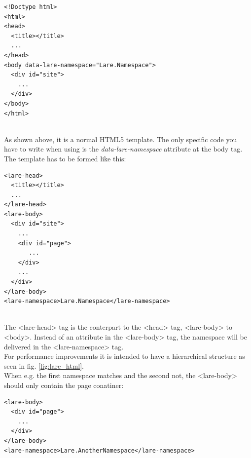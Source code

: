 \begin{minipage}[c]{0.95\linewidth}
\begin{lstlisting}[caption=Example Lare Base Template, label=example_lare_base_template]
<!Doctype html>
<html>
<head>
  <title></title>
  ...
</head>
<body data-lare-namespace="Lare.Namespace">
  <div id="site">
    ...
  </div>
</body>
</html>
\end{lstlisting}
\end{minipage}
\\
As shown above, it is a normal HTML5 template.
The only specific code you have to write when using \lare{} is the \emph{data-lare-namespace} attribute at the body tag.
\\
The \lare{} template has to be formed like this:

\begin{minipage}[c]{0.95\linewidth}
\begin{lstlisting}[caption=Example Lare Template, label=example_lare_template]
<lare-head>
  <title></title>
  ...
</lare-head>
<lare-body>
  <div id="site">
    ...
    <div id="page">
       ...
    </div>
    ...
  </div>
</lare-body>
<lare-namespace>Lare.Namespace</lare-namespace>
\end{lstlisting}
\end{minipage}
\\
The <lare-head> tag is the conterpart to the <head> tag, <lare-body> to <body>.
Instead of an attribute in the <lare-body> tag, the namespace will be delivered in the <lare-namespace> tag.
\\
For performance improvements it is intended to have a hierarchical structure as seen in fig. \ref{fig:lare_html}.
\\
When e.g. the first namespace matches and the second not, the <lare-body> should only contain the page conatiner:

\begin{minipage}[c]{0.95\linewidth}
\begin{lstlisting}[caption=Example Lare Response, label=example_lare_response]
<lare-body>
  <div id="page">
    ...
  </div>
</lare-body>
<lare-namespace>Lare.AnotherNamespace</lare-namespace>
\end{lstlisting}
\end{minipage}



